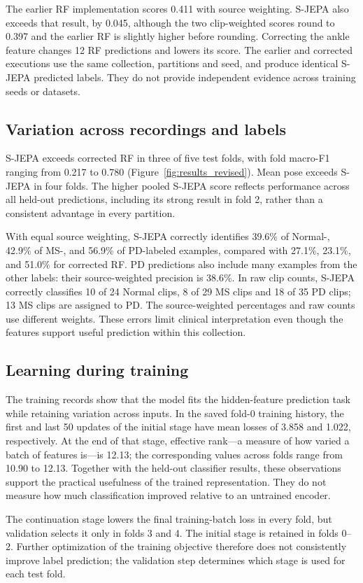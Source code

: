 The earlier RF implementation scores 0.411 with source weighting. S-JEPA also exceeds that result, by 0.045, although the two clip-weighted scores round to 0.397 and the earlier RF is slightly higher before rounding. Correcting the ankle feature changes 12 RF predictions and lowers its score. The earlier and corrected executions use the same collection, partitions and seed, and produce identical S-JEPA predicted labels. They do not provide independent evidence across training seeds or datasets.

\subsection{Variation across recordings and labels}
S-JEPA exceeds corrected RF in three of five test folds, with fold macro-F1 ranging from 0.217 to 0.780 (Figure~\ref{fig:results_revised}). Mean pose exceeds S-JEPA in four folds. The higher pooled S-JEPA score reflects performance across all held-out predictions, including its strong result in fold 2, rather than a consistent advantage in every partition.

With equal source weighting, S-JEPA correctly identifies 39.6\% of Normal-, 42.9\% of MS-, and 56.9\% of PD-labeled examples, compared with 27.1\%, 23.1\%, and 51.0\% for corrected RF. PD predictions also include many examples from the other labels: their source-weighted precision is 38.6\%. In raw clip counts, S-JEPA correctly classifies 10 of 24 Normal clips, 8 of 29 MS clips and 18 of 35 PD clips; 13 MS clips are assigned to PD. The source-weighted percentages and raw counts use different weights. These errors limit clinical interpretation even though the features support useful prediction within this collection.

\subsection{Learning during training}
The training records show that the model fits the hidden-feature prediction task while retaining variation across inputs. In the saved fold-0 training history, the first and last 50 updates of the initial stage have mean losses of 3.858 and 1.022, respectively. At the end of that stage, effective rank---a measure of how varied a batch of features is---is 12.13; the corresponding values across folds range from 10.90 to 12.13. Together with the held-out classifier results, these observations support the practical usefulness of the trained representation. They do not measure how much classification improved relative to an untrained encoder.

The continuation stage lowers the final training-batch loss in every fold, but validation selects it only in folds 3 and 4. The initial stage is retained in folds 0--2. Further optimization of the training objective therefore does not consistently improve label prediction; the validation step determines which stage is used for each test fold.
